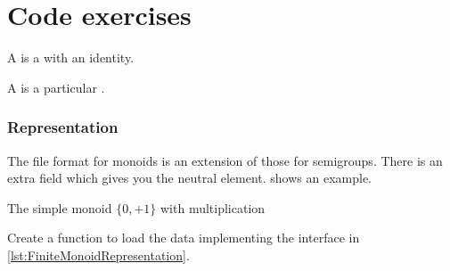 
\section{\usebox{\chaptergear}
  Code exercises}

A \Monoid is a \Semigroup with an identity.



A \FiniteMonoid is a particular \FiniteSemigroup.


\subsubsection*{Representation}
%

The file format for monoids is an extension of those for semigroups.
There is an extra field  which gives you the neutral element.
 shows an example.


\begin{marginfigure}%
    \caption{The simple monoid $\{0,+1\}$ with multiplication}%
    \label{fig:monoid2}%
\end{marginfigure}%


\begin{codeexercise}
    Create a function to load the data implementing the 
    interface in \cref{lst:FiniteMonoidRepresentation}.
\end{codeexercise}


